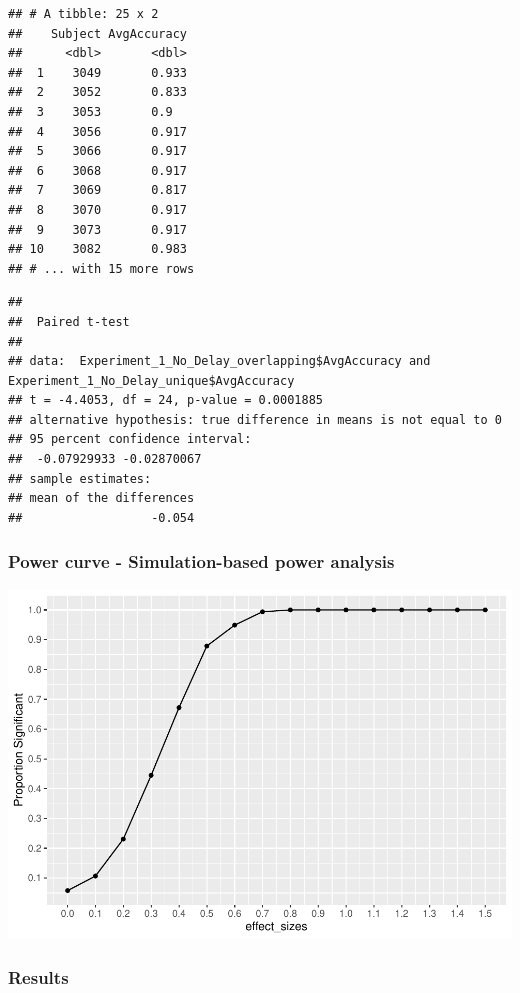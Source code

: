 \documentclass[
  english,
  man]{article}
\begin{document}
\begin{verbatim}
## # A tibble: 25 x 2
##    Subject AvgAccuracy
##      <dbl>       <dbl>
##  1    3049       0.933
##  2    3052       0.833
##  3    3053       0.9  
##  4    3056       0.917
##  5    3066       0.917
##  6    3068       0.917
##  7    3069       0.817
##  8    3070       0.917
##  9    3073       0.917
## 10    3082       0.983
## # ... with 15 more rows
\end{verbatim}

\begin{verbatim}
## 
##  Paired t-test
## 
## data:  Experiment_1_No_Delay_overlapping$AvgAccuracy and Experiment_1_No_Delay_unique$AvgAccuracy
## t = -4.4053, df = 24, p-value = 0.0001885
## alternative hypothesis: true difference in means is not equal to 0
## 95 percent confidence interval:
##  -0.07929933 -0.02870067
## sample estimates:
## mean of the differences 
##                  -0.054
\end{verbatim}

\hypertarget{power-curve---simulation-based-power-analysis}{%
\subsubsection{Power curve - Simulation-based power analysis}\label{power-curve---simulation-based-power-analysis}}

\includegraphics{Reproduced-analysis_stats_I_files/figure-latex/unnamed-chunk-3-1.pdf}

\hypertarget{results}{%
\subsubsection{Results}\label{results}}
\end{document}
